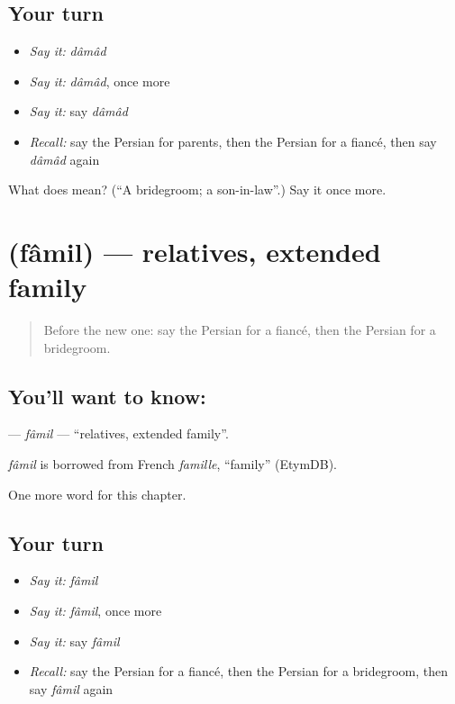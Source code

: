 \subsection*{Your turn}
\begin{itemize}
\raggedright
  \item \emph{Say it:} \emph{dâmâd}
  \item \emph{Say it:} \emph{dâmâd}, once more
  \item \emph{Say it:} say \emph{dâmâd}
  \item \emph{Recall:} say the Persian for parents, then the Persian for a fiancé, then say \emph{dâmâd} again
\end{itemize}

\begin{tcolorbox}[breakable,colback=teal!4,colframe=teal!35!black,title={Before you move on}]
What does  mean? (\textquotedblleft{}A bridegroom; a son-in-law\textquotedblright{}.) Say it once more.
\end{tcolorbox}
\section[\texorpdfstring{\fa{فامیل} (fâmil)}{فامیل (fâmil)}]{ (fâmil) — relatives, extended family}

\label{lesson:FA-C277-famil}



\begin{quote}
Before the new one: say the Persian for a fiancé, then the Persian for a bridegroom.
\end{quote}

\subsection*{You'll want to know: }
\textbf{} — \emph{fâmil} — \textquotedblleft{}relatives, extended family\textquotedblright{}.

\begin{cousinweb}
\emph{fâmil} is borrowed from French \emph{famille}, \textquotedblleft{}family\textquotedblright{} (EtymDB).
\end{cousinweb}

\begin{grammarlens}[title={What you've built}]
One more word for this chapter.
\end{grammarlens}

\subsection*{Your turn}
\begin{itemize}
\raggedright
  \item \emph{Say it:} \emph{fâmil}
  \item \emph{Say it:} \emph{fâmil}, once more
  \item \emph{Say it:} say \emph{fâmil}
  \item \emph{Recall:} say the Persian for a fiancé, then the Persian for a bridegroom, then say \emph{fâmil} again
\end{itemize}

